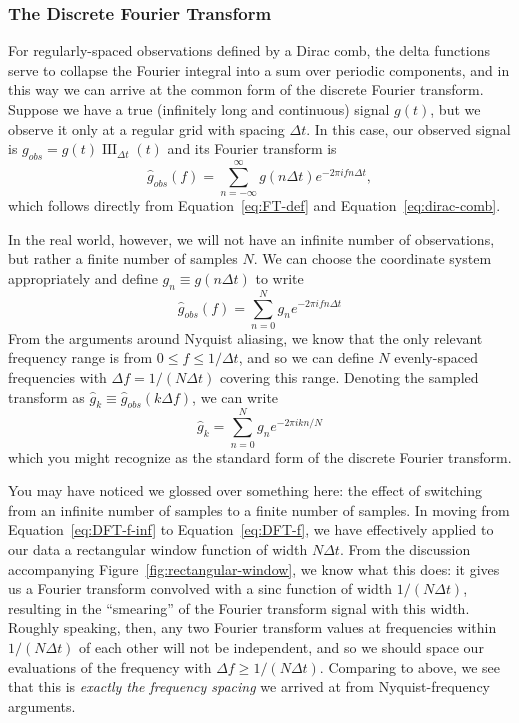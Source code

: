 \documentclass[preprint]{aastex}
\DeclareMathOperator{\III}{III}
\newcommand{\fig}[1]{Figure~\ref{fig:#1}}
\newcommand{\Eq}[1]{Equation~\ref{eq:#1}}
\newcommand{\eq}[1]{\Eq{#1}}
\newcommand{\eqlabel}[1]{\label{eq:#1}}
\begin{document}
\subsubsection{The Discrete Fourier Transform}
For regularly-spaced observations defined by a Dirac comb, the delta functions
serve to collapse the Fourier integral into a sum over periodic components,
and in this way we can arrive at the common form of the discrete Fourier
transform.
Suppose we have a true (infinitely long and continuous) signal $g(t)$, but
we observe it only at a regular grid with spacing $\Delta t$. In this case, our
observed signal is $g_{obs} = g(t) \III_{\Delta t}(t)$ and its Fourier transform is
\begin{equation}
  \hat{g}_{obs}(f) = \sum_{n=-\infty}^\infty g(n\Delta t) e^{-2\pi i f n \Delta t},
  \eqlabel{DFT-f-inf}
\end{equation}
which follows directly from \eq{FT-def} and \eq{dirac-comb}.

In the real world, however, we will not have an infinite number of observations,
but rather a finite number of samples $N$.
We can choose the coordinate system appropriately and define
$g_n \equiv g(n\Delta t)$ to write
\begin{equation}
  \hat{g}_{obs}(f) = \sum_{n=0}^N g_n e^{-2\pi i f n \Delta t}
  \eqlabel{DFT-f}
\end{equation}
From the arguments around Nyquist aliasing, we know that the only relevant
frequency range is from $0 \le f \le 1/\Delta t$, and so we can define $N$
evenly-spaced frequencies with $\Delta f = 1 / (N\Delta t)$ covering this range.
Denoting the sampled transform as
$\hat{g}_k \equiv \hat{g}_{obs}(k\Delta f)$, we can write
\begin{equation}
  \hat{g}_k = \sum_{n=0}^N g_n e^{-2\pi i k n / N}
  \eqlabel{DFT}
\end{equation}
which you might recognize as the standard form of the discrete Fourier
transform.

You may have noticed we glossed over something here: the effect of switching
from an infinite number of samples to a finite number of samples.
In moving from \eq{DFT-f-inf} to \eq{DFT-f}, we have effectively applied
to our data a rectangular window function of width $N\Delta t$.
From the discussion accompanying \fig{rectangular-window}, we know what this
does: it gives us a Fourier transform convolved with a sinc function of width
$1 / (N\Delta t)$, resulting in the ``smearing'' of the Fourier transform signal
with this width.
Roughly speaking, then, any two Fourier transform values at frequencies within
$1/(N\Delta t)$ of each other will not be independent, and so we should space
our evaluations of the frequency with $\Delta f \ge 1/(N\Delta t)$.
Comparing to above, we see that this is {\it exactly the frequency spacing}
we arrived at from Nyquist-frequency arguments.
\end{document}
